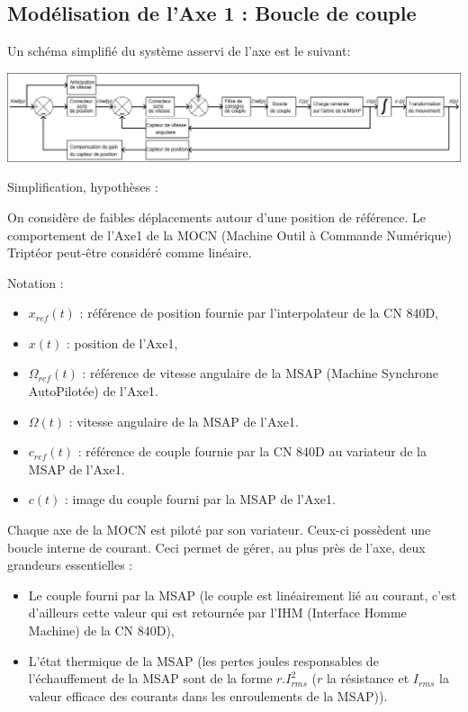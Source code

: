 \newpage

\subsection{Modélisation de l'Axe 1 : Boucle de couple}

Un schéma simplifié du système asservi de l'axe est le suivant:

\begin{center}
 \includegraphics[width=0.8\linewidth]{img/img18}
\end{center}

Simplification, hypothèses :

On considère de faibles déplacements autour d'une position de référence. Le comportement de l'Axe1 de la MOCN (Machine Outil à Commande Numérique) Triptéor peut-être considéré comme linéaire.


Notation :
\begin{itemize}
 \item $x_{ref}(t)$ : référence de position fournie par l'interpolateur de la CN 840D,
 \item $x(t)$ : position de l'Axe1,
 \item $\Omega_{ref}(t)$ : référence de vitesse angulaire de la MSAP (Machine Synchrone AutoPilotée) de l'Axe1.
 \item $\Omega(t)$ : vitesse angulaire de la MSAP de l'Axe1.
 \item $c_{ref}(t)$ : référence de couple fournie par la CN 840D au variateur de la MSAP de l'Axe1.
 \item $c(t)$ : image du couple fourni par la MSAP de l'Axe1.
\end{itemize}

Chaque axe de la MOCN est piloté par son variateur. Ceux-ci possèdent une boucle interne de courant. Ceci permet de gérer, au plus près de l'axe, deux grandeurs essentielles :
\begin{itemize}
 \item Le couple fourni par la MSAP (le couple est linéairement lié au courant, c'est d'ailleurs cette valeur qui est retournée par l'IHM (Interface Homme Machine) de la CN 840D),
 \item L'état thermique de la MSAP (les pertes joules responsables de l'échauffement de la MSAP sont de la forme $r.I_{rms}^2$ ($r$ la résistance et $I_{rms}$ la valeur efficace des courants dans les enroulements de la MSAP)).
\end{itemize}

